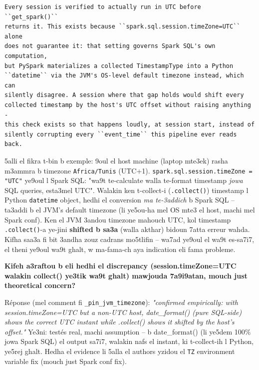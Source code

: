 \documentclass[11pt,a4paper]{report}
\DeclareRobustCommand{\code}[1]{\texttt{#1}}
\begin{document}
\begin{lstlisting}[style=pystyle]
Every session is verified to actually run in UTC before ``get_spark()``
returns it. This exists because ``spark.sql.session.timeZone=UTC`` alone
does not guarantee it: that setting governs Spark SQL's own computation,
but PySpark materializes a collected TimestampType into a Python
``datetime`` via the JVM's OS-level default timezone instead, which can
silently disagree. A session where that gap holds would shift every
collected timestamp by the host's UTC offset without raising anything -
this check exists so that happens loudly, at session start, instead of
silently corrupting every ``event_time`` this pipeline ever reads back.
\end{lstlisting}

\begin{analogy}
5alli el fikra t-bin b exemple: 9oul el host machine (laptop mte3ek) rasha
m3ammra b timezone \code{Africa/Tunis} (UTC+1). \code{spark.sql.session.timeZone
= "UTC"} ye9oul l Spark SQL: "wa9t te-calculate walla te-format timestamp
\emph{jowa} SQL queries, esta3mel UTC". Walakin ken t-collect-i (\code{.collect()})
timestamp l Python \code{datetime} object, hedhi el conversion \emph{ma
te-3addich} b Spark SQL -- ta3addi b el JVM's default timezone (li ye5ou-ha
mel OS mte3 el host, machi mel Spark conf). Ken el JVM 3andou timezone
mahouch UTC, kol timestamp \code{.collect()}-a ye-jini \textbf{shifted b
sa3a} (walla akthar) bidoun 7atta erreur wahda. Kifha saa3a fi bit 3andha
zouz cadrans mo5tlifin -- wa7ad ye9oul el wa9t es-sa7i7, el theni ye9oul
wa9t ghalt, w ma-fama-ch aya indication eli fama probleme.
\end{analogy}

\begin{soual}
\textbf{Kifeh a3raftou b eli hedhi el discrepancy (session.timeZone=UTC
walakin collect() ye3tik wa9t ghalt) mawjouda 7a9i9atan, mouch just
theoretical concern?}

Réponse (mel comment fi \code{\_pin\_jvm\_timezone}): \emph{"confirmed
empirically: with session.timeZone=UTC but a non-UTC host, date\_format()
(pure SQL-side) shows the correct UTC instant while .collect() shows it
shifted by the host's offset."} Ye3ni: testés real, machi assumption --
b date\_format() (li ye5dem 100\% jowa Spark SQL) el output sa7i7, walakin
nafs el instant, ki t-collect-ih l Python, ye5rej ghalt. Hedha el evidence
li 5alla el authors yzidou el \code{TZ} environment variable fix (mouch
just Spark conf fix).
\end{soual}
\end{document}
